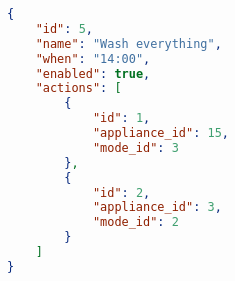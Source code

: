 \begin{lstlisting}[language=json,caption={Example of a routine with two actions.},label=routine_json,float,floatplacement=H]
{
    "id": 5,
    "name": "Wash everything",
    "when": "14:00",
    "enabled": true,
    "actions": [
        {
            "id": 1,
            "appliance_id": 15,
            "mode_id": 3
        },
        {
            "id": 2,
            "appliance_id": 3,
            "mode_id": 2
        }
    ]
}
\end{lstlisting}